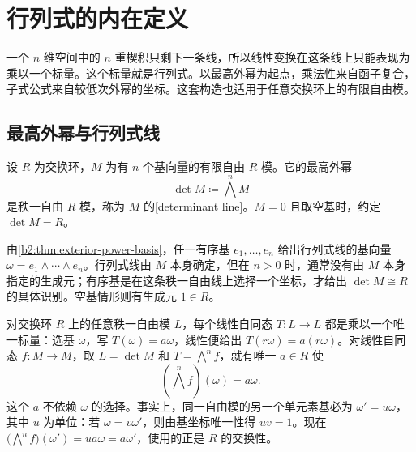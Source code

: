 
\section{行列式的内在定义}
\label{b2:sec:0903}

一个 \(n\) 维空间中的 \(n\) 重楔积只剩下一条线，所以线性变换在这条线上只能表现为乘以一个标量。这个标量就是行列式。以最高外幂为起点，乘法性来自函子复合，子式公式来自较低次外幂的坐标。这套构造也适用于任意交换环上的有限自由模。

%
%

\subsection{最高外幂与行列式线}
\label{b2:subsec:0903:01}

\begin{definition}\label{b2:def:determinant-line}
	设 \(R\) 为交换环，\(M\) 为有 \(n\) 个基向量的有限自由 \(R\) 模。它的最高外幂
	\[
		\det M\coloneqq\bigwedge^nM
	\]
	是秩一自由 \(R\) 模，称为 \(M\) 的[determinant line]。\(M=0\) 且取空基时，约定 \(\det M=R\)。
\end{definition}

由\cref{b2:thm:exterior-power-basis}，任一有序基 \(e_1,\ldots,e_n\) 给出行列式线的基向量 \(\omega=e_1\wedge\cdots\wedge e_n\)。行列式线由 \(M\) 本身确定，但在 \(n>0\) 时，通常没有由 \(M\) 本身指定的生成元；有序基是在这条秩一自由线上选择一个坐标，才给出 \(\det M\cong R\) 的具体识别。空基情形则有生成元 \(1\in R\)。

\ProseParagraphBreak
对交换环 \(R\) 上的任意秩一自由模 \(L\)，每个线性自同态 \(T:L\to L\) 都是乘以一个唯一标量：选基 \(\omega\)，写 \(T(\omega)=a\omega\)，线性便给出 \(T(r\omega)=a(r\omega)\)。对线性自同态 \(f:M\to M\)，取 \(L=\det M\) 和 \(T=\bigwedge^n f\)，就有唯一 \(a\in R\) 使
\begin{equation}\label{b2:eq:intrinsic-determinant}
	\left(\bigwedge^n f\right)(\omega)=a\omega.
\end{equation}
这个 \(a\) 不依赖 \(\omega\) 的选择。事实上，同一自由模的另一个单元素基必为 \(\omega'=u\omega\)，其中 \(u\) 为单位：若 \(\omega=v\omega'\)，则由基坐标唯一性得 \(uv=1\)。现在 \(\bigl(\bigwedge^n f\bigr)(\omega')=u a\omega=a\omega'\)，使用的正是 \(R\) 的交换性。

